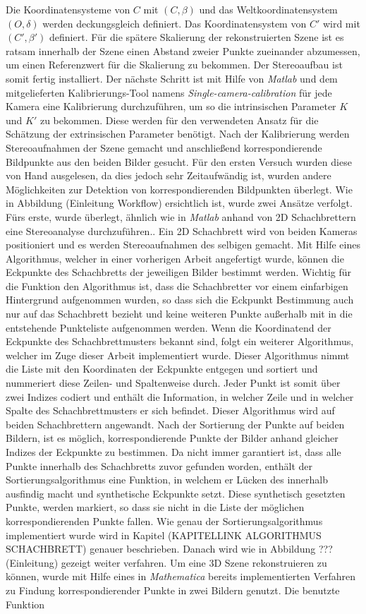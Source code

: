 Die Koordinatensysteme von $C$ mit $(C, \beta)$ und das Weltkoordinatensystem $(O,\delta)$ werden deckungsgleich definiert. Das Koordinatensystem von $C'$ wird mit $(C', \beta')$ definiert. Für die spätere Skalierung der rekonstruierten Szene ist es ratsam innerhalb der Szene einen Abstand zweier Punkte zueinander abzumessen, um einen Referenzwert für die Skalierung zu bekommen. Der Stereoaufbau ist somit fertig installiert. Der nächste Schritt ist mit Hilfe von \textit{Matlab} und dem mitgelieferten Kalibrierungs-Tool namens \textit{Single-camera-calibration} für jede Kamera eine Kalibrierung durchzuführen, um so  die intrinsischen Parameter $K$ und $K'$ zu bekommen. Diese werden für den verwendeten Ansatz für die Schätzung der extrinsischen Parameter benötigt. Nach der Kalibrierung werden Stereoaufnahmen der Szene gemacht und anschließend korrespondierende Bildpunkte aus den beiden Bilder gesucht. Für den ersten Versuch wurden diese von Hand ausgelesen, da dies jedoch sehr Zeitaufwändig ist, wurden andere Möglichkeiten zur Detektion von korrespondierenden Bildpunkten überlegt. Wie in Abbildung (Einleitung Workflow) ersichtlich ist, wurde zwei Ansätze verfolgt. Fürs erste, wurde überlegt, ähnlich wie in \textit{Matlab} anhand von 2D Schachbrettern eine Stereoanalyse durchzuführen.\cite{MatlabStereoApp}. Ein 2D Schachbrett wird von beiden Kameras positioniert und es werden Stereoaufnahmen des selbigen gemacht. Mit Hilfe eines Algorithmus, welcher in einer vorherigen Arbeit angefertigt wurde, können die Eckpunkte des Schachbretts der jeweiligen Bilder bestimmt werden. Wichtig für die Funktion den Algorithmus ist, dass die Schachbretter vor einem einfarbigen Hintergrund aufgenommen wurden, so dass sich die Eckpunkt Bestimmung auch nur auf das Schachbrett bezieht und keine weiteren Punkte außerhalb mit in die entstehende Punkteliste aufgenommen werden. Wenn die Koordinatend der Eckpunkte des Schachbrettmusters bekannt sind, folgt ein weiterer Algorithmus, welcher im Zuge dieser Arbeit implementiert wurde. Dieser Algorithmus nimmt die Liste mit den Koordinaten der Eckpunkte entgegen und sortiert und nummeriert diese Zeilen- und Spaltenweise durch. Jeder Punkt ist somit über zwei Indizes codiert und enthält die Information, in welcher Zeile und in welcher Spalte des Schachbrettmusters er sich befindet. Dieser Algorithmus wird auf beiden Schachbrettern angewandt. Nach der Sortierung der Punkte auf beiden Bildern, ist es möglich, korrespondierende Punkte der Bilder anhand gleicher Indizes der Eckpunkte zu bestimmen. Da nicht immer garantiert ist, dass alle Punkte innerhalb des Schachbretts zuvor gefunden worden, enthält der Sortierungsalgorithmus eine Funktion, in welchem er Lücken des innerhalb ausfindig macht und synthetische Eckpunkte setzt. Diese synthetisch gesetzten Punkte, werden markiert, so dass sie nicht in die Liste der möglichen korrespondierenden Punkte fallen. Wie genau der Sortierungsalgorithmus implementiert wurde wird in Kapitel (KAPITELLINK ALGORITHMUS SCHACHBRETT) genauer beschrieben. Danach wird wie in Abbildung ???(Einleitung) gezeigt weiter verfahren. Um eine 3D Szene rekonstruieren zu können, wurde mit Hilfe eines in \textit{Mathematica} bereits implementierten Verfahren zu Findung korrespondierender Punkte in zwei Bildern genutzt. Die benutzte Funktion 